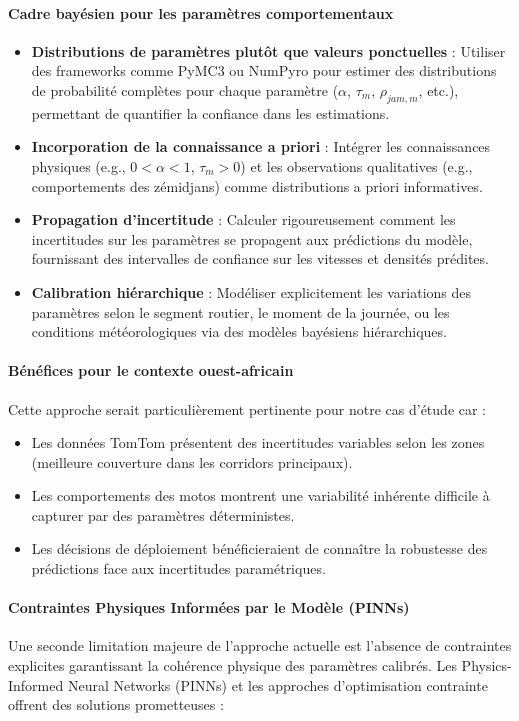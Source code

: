 \paragraph{Cadre bayésien pour les paramètres comportementaux}
\begin{itemize}
    \item \textbf{Distributions de paramètres plutôt que valeurs ponctuelles} : Utiliser des frameworks comme PyMC3 ou NumPyro pour estimer des distributions de probabilité complètes pour chaque paramètre ($\alpha$, $\tau_m$, $\rho_{jam,m}$, etc.), permettant de quantifier la confiance dans les estimations.
    \item \textbf{Incorporation de la connaissance a priori} : Intégrer les connaissances physiques (e.g., $0 < \alpha < 1$, $\tau_m > 0$) et les observations qualitatives (e.g., comportements des zémidjans) comme distributions a priori informatives.
    \item \textbf{Propagation d'incertitude} : Calculer rigoureusement comment les incertitudes sur les paramètres se propagent aux prédictions du modèle, fournissant des intervalles de confiance sur les vitesses et densités prédites.
    \item \textbf{Calibration hiérarchique} : Modéliser explicitement les variations des paramètres selon le segment routier, le moment de la journée, ou les conditions météorologiques via des modèles bayésiens hiérarchiques.
\end{itemize}

\paragraph{Bénéfices pour le contexte ouest-africain}
Cette approche serait particulièrement pertinente pour notre cas d'étude car :
\begin{itemize}
    \item Les données TomTom présentent des incertitudes variables selon les zones (meilleure couverture dans les corridors principaux).
    \item Les comportements des motos montrent une variabilité inhérente difficile à capturer par des paramètres déterministes.
    \item Les décisions de déploiement bénéficieraient de connaître la robustesse des prédictions face aux incertitudes paramétriques.
\end{itemize}

\paragraph{Contraintes Physiques Informées par le Modèle (PINNs)}
Une seconde limitation majeure de l'approche actuelle est l'absence de contraintes explicites garantissant la cohérence physique des paramètres calibrés. Les Physics-Informed Neural Networks (PINNs) et les approches d'optimisation contrainte offrent des solutions prometteuses :

